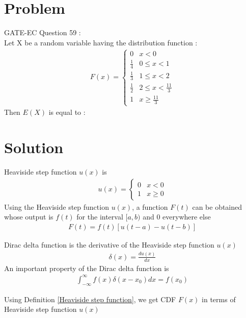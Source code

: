 \documentclass[journal,12pt,twocolumn]{IEEEtran}
\begin{document}
\section*{\textbf{Problem}}
GATE-EC Question 59 : \\
Let X be a random variable having the distribution function :
\begin{align*}
F(x)=   
\begin{cases}
0 & x<0 \\
\frac{1}{4} & 0\le x<1 \\
\frac{1}{3} & 1\le x<2 \\
\frac{1}{2} & 2\le x<\frac{11}{3} \\
1 & x\ge\frac{11}{3}
\end{cases}
\end{align*}
Then $E(X)$ is equal to :
\section*{\textbf{Solution}}
\begin{definition}
\label{Heaviside step function}
Heaviside step function $u(x)$ is 
\begin{align*}
u(x)=                
    \begin{cases}
    0 & x<0 \\
    1 & x\geq 0
    \end{cases}
\end{align*}
Using the Heaviside step function $u(x)$, a function $F(t)$ can be obtained whose output is $f(t)$ for the interval $[a,b)$ and $0$ everywhere else
\begin{align*}
    F(t)=f(t)[u(t-a) - u(t-b)] \tag{1} \label{1}
\end{align*}
\end{definition}
\begin{definition}
\label{Dirac delta function}
Dirac delta function is the derivative of the Heaviside step function $u(x)$
\begin{align*}
    \delta(x) = \frac{du(x)}{dx} \tag{2} \label{2}
\end{align*}
An important property of the Dirac delta function is 
\begin{align*}
    \int_{-\infty}^{\infty}f(x)\delta(x-x_0)dx = f(x_0) \tag{3} \label{3}
\end{align*}
\end{definition}
Using Definition \ref{Heaviside step function}, we get CDF $F(x)$ in terms of Heaviside step function $u(x)$
\end{document}
